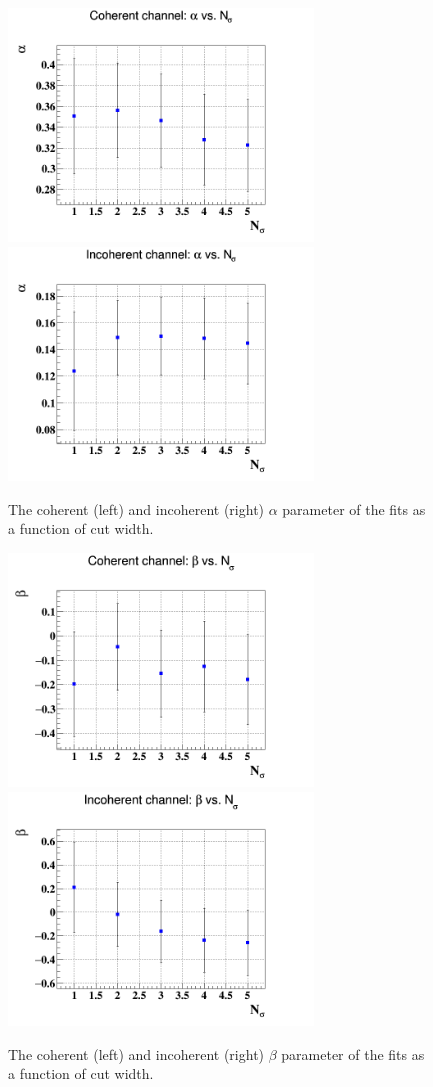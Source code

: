 \begin{figure}[tbp]
   \includegraphics[height=6.2cm]{fig/coh_alpha_Nsig.png}
   \includegraphics[height=6.2cm]{fig/incoh_alpha_Nsig.png}
   \caption{The coherent (left) and incoherent (right) $\alpha$ parameter of 
the fits as a function of cut width.  }
\label{fig:sys_fit_alpha}
\end{figure}

\begin{figure}[tbp]
   \includegraphics[height=6.2cm]{fig/coh_beta_Nsig.png}
   \includegraphics[height=6.2cm]{fig/incoh_beta_Nsig.png}
   \caption{The coherent (left) and incoherent (right) $\beta$ parameter of the 
fits as a function of cut width.  }
\label{fig:sys_fit_beta}
\end{figure}

